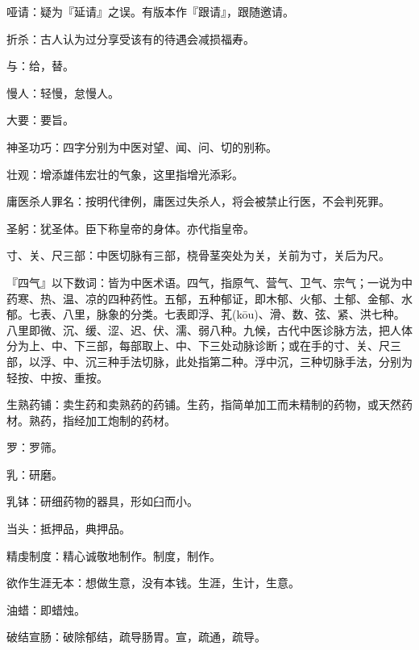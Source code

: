 \startbuffer[1933]
哑请：疑为『延请』之误。有版本作『跟请』，跟随邀请。
\stopbuffer


\startbuffer[1934]
折杀：古人认为过分享受该有的待遇会减损福寿。
\stopbuffer


\startbuffer[1935]
与：给，替。
\stopbuffer


\startbuffer[1936]
慢人：轻慢，怠慢人。
\stopbuffer


\startbuffer[1937]
大要：要旨。
\stopbuffer


\startbuffer[1938]
神圣功巧：四字分别为中医对望、闻、问、切的别称。
\stopbuffer


\startbuffer[1939]
壮观：增添雄伟宏壮的气象，这里指增光添彩。
\stopbuffer


\startbuffer[1940]
庸医杀人罪名：按明代律例，庸医过失杀人，将会被禁止行医，不会判死罪。
\stopbuffer


\startbuffer[1941]
圣躬：犹圣体。臣下称皇帝的身体。亦代指皇帝。
\stopbuffer


\startbuffer[1942]
寸、关、尺三部：中医切脉有三部，桡骨茎突处为关，关前为寸，关后为尺。
\stopbuffer


\startbuffer[1943]
『四气』以下数词：皆为中医术语。四气，指原气、营气、卫气、宗气；一说为中药寒、热、温、凉的四种药性。五郁，五种郁证，即木郁、火郁、土郁、金郁、水郁。七表、八里，脉象的分类。七表即浮、芤(kōu)、滑、数、弦、紧、洪七种。八里即微、沉、缓、涩、迟、伏、濡、弱八种。九候，古代中医诊脉方法，把人体分为上、中、下三部，每部取上、中、下三处动脉诊断；或在手的寸、关、尺三部，以浮、中、沉三种手法切脉，此处指第二种。浮中沉，三种切脉手法，分别为轻按、中按、重按。
\stopbuffer


\startbuffer[1944]
生熟药铺：卖生药和卖熟药的药铺。生药，指简单加工而未精制的药物，或天然药材。熟药，指经加工炮制的药材。
\stopbuffer


\startbuffer[1945]
罗：罗筛。
\stopbuffer


\startbuffer[1946]
乳：研磨。
\stopbuffer


\startbuffer[1947]
乳钵：研细药物的器具，形如臼而小。
\stopbuffer


\startbuffer[1948]
当头：抵押品，典押品。
\stopbuffer


\startbuffer[1949]
精虔制度：精心诚敬地制作。制度，制作。
\stopbuffer


\startbuffer[1950]
欲作生涯无本：想做生意，没有本钱。生涯，生计，生意。
\stopbuffer


\startbuffer[1951]
油蜡：即蜡烛。
\stopbuffer


\startbuffer[1952]
破结宣肠：破除郁结，疏导肠胃。宣，疏通，疏导。
\stopbuffer


